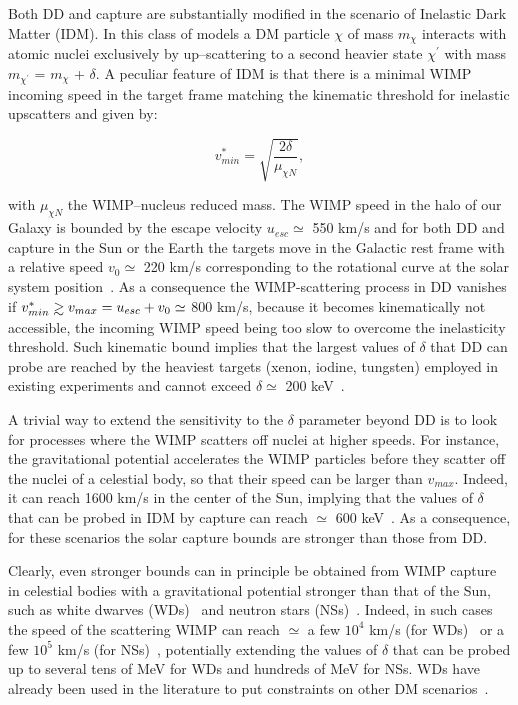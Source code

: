 \documentclass[11pt]{article}
\newcommand{\gsim}{\mathrel{\mathop{\kern 0pt
      \rlap{\raise.2ex\hbox{$>$}}}\lower.9ex\hbox{\kern-.190em $\sim$}}}
\begin{document}
Both DD and capture are substantially modified in the scenario of Inelastic Dark Matter (IDM). In this class of models a DM particle $\chi$ of mass $m_\chi$ interacts with atomic nuclei exclusively by up--scattering to a second heavier state $\chi^{\prime}$ with mass $m_{\chi^{\prime}}$ = $m_\chi$ + $\delta$. A peculiar feature of IDM is that there is a minimal WIMP incoming
speed in the target frame matching the kinematic threshold for inelastic upscatters and given by:

\begin{equation}
    v^*_{min}=\sqrt{\frac{2\delta}{\mu_{\chi N}}},
    \label{eq:vstar}
\end{equation}


\noindent with $\mu_{\chi N}$ the WIMP--nucleus reduced mass. The WIMP speed in the halo of our Galaxy is bounded by the escape velocity $u_{esc}\simeq$ 550 km/s and for both DD and capture in the Sun or the Earth the targets move in the Galactic rest frame with a relative speed $v_0\simeq$ 220 km/s corresponding to the rotational curve at the solar system position~\cite{SHM_Green:2011}.  As a consequence the WIMP-scattering process in DD vanishes if $v^*_{min}\gsim v_{max} = u_{esc} + v_0\simeq$ 800 km/s, because it becomes kinematically not accessible, the incoming WIMP speed being too slow to overcome the inelasticity threshold. Such kinematic bound implies that the largest values of $\delta$ that DD can probe are reached by the heaviest targets (xenon, iodine, tungsten) employed in existing experiments and cannot exceed $\delta\simeq$ 200 keV~\cite{iDM_DD_Nagata2014}.


A trivial way to extend the sensitivity to the $\delta$ parameter beyond DD is to look for processes where the WIMP scatters off nuclei at higher speeds.  For instance, the gravitational potential accelerates the WIMP particles before they scatter off the nuclei of a celestial body, so that their speed can be larger than $v_{max}$. Indeed, it can reach 1600 km/s in the center of the Sun, implying that the values of $\delta$ that can be probed in IDM by capture can reach $\simeq$ 600 keV~\cite{idm_sun_Catena_2018}. As a consequence, for these scenarios the solar capture bounds are stronger than those from DD.

Clearly, even stronger bounds can in principle be obtained from WIMP capture in celestial bodies with a gravitational potential stronger than that of the Sun, such as 
white dwarves (WDs)~\cite{idm_wd_2010, idm_wd_2010_Hooper, higgino_wd_2019} and neutron stars (NSs)~\cite{IDM_neutron_stars_2018, IDM_neutron_stars_2022}. Indeed, in such cases the speed of the scattering WIMP can reach $\simeq$ a few $10^4$ km/s (for WDs)~\cite{improved_WD_2021} or a few $10^5$ km/s (for NSs)~\cite{improved_neutron_stars_2020}, potentially extending the values of $\delta$ that can be probed up to several tens of MeV for WDs and hundreds of MeV for NSs.
WDs have already been used in the literature to put constraints on other DM scenarios~\cite{Cermeno:2018qgu}.
\end{document}
